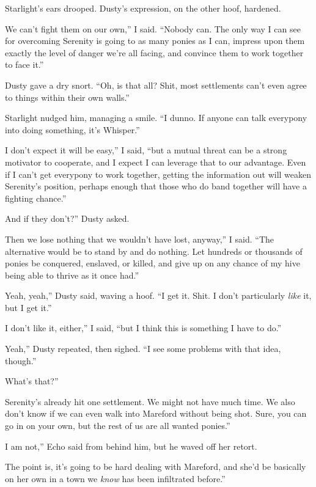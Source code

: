Starlight’s ears drooped. Dusty’s expression, on the other hoof, hardened.

\leavevmode{}We can’t fight them on our own,” I said. “Nobody can. The only way I can see for overcoming Serenity is going to as many ponies as I can, impress upon them exactly the level of danger we’re all facing, and convince them to work together to face it.”

Dusty gave a dry snort. “Oh, is that all? Shit, most settlements can’t even agree to things within their own walls.”

Starlight nudged him, managing a smile. “I dunno. If anyone can talk everypony into doing something, it’s Whisper.”

\leavevmode{}I don’t expect it will be easy,” I said, “but a mutual threat can be a strong motivator to cooperate, and I expect I can leverage that to our advantage. Even if I can’t get everypony to work together, getting the information out will weaken Serenity’s position, perhaps enough that those who do band together will have a fighting chance.”

\leavevmode{}And if they don’t?” Dusty asked.

\leavevmode{}Then we lose nothing that we wouldn’t have lost, anyway,” I said. “The alternative would be to stand by and do nothing. Let hundreds or thousands of ponies be conquered, enslaved, or killed, and give up on any chance of my hive being able to thrive as it once had.”

\leavevmode{}Yeah, yeah,” Dusty said, waving a hoof. “I get it. Shit. I don’t particularly \textit{like} it, but I get it.”

\leavevmode{}I don’t like it, either,” I said, “but I think this is something I have to do.”

\leavevmode{}Yeah,” Dusty repeated, then sighed. “I see some problems with that idea, though.”

\leavevmode{}What’s that?”

\leavevmode{}Serenity’s already hit one settlement. We might not have much time. We also don’t know if we can even walk into Mareford without being shot. Sure, you can go in on your own, but the rest of us are all wanted ponies.”

\leavevmode{}I am not,” Echo said from behind him, but he waved off her retort.

\leavevmode{}The point is, it’s going to be hard dealing with Mareford, and she’d be basically on her own in a town we \textit{know} has been infiltrated before.”

